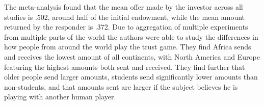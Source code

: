 \documentclass[12pt]{article}
\begin{document}
The meta-analysis found that the mean offer made by the investor across all studies is .502, around half of the initial endowment, while the mean amount returned by the responder is .372. Due to aggregation of multiple experiments from multiple parts of the world the authors were able to study the differences in how people from around the world play the trust game. They find Africa sends and receives the lowest amount of all continents, with North America and Europe featuring the highest amounts both sent and received. They find further that older people send larger amounts, students send significantly lower amounts than non-students, and that amounts sent are larger if the subject believes he is playing with another human player. 
%
%
%
%
%
%
%
%
%
\end{document}
